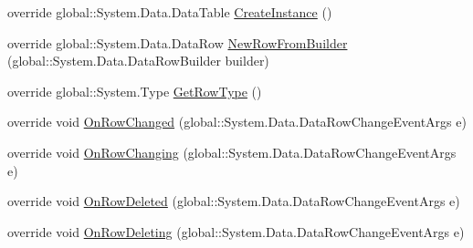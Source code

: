 \begin{DoxyCompactItemize}
\item 
override global\+::\+System.\+Data.\+Data\+Table \hyperlink{class_env_int_1_1_win32_1_1_field_tech_1_1_manager_1_1_data_sets_1_1_guide_ware_mobile_data_set_1_1_calibration_data_table_a2c941f5945959302f3eb4aafe6758c40}{Create\+Instance} ()
\item 
override global\+::\+System.\+Data.\+Data\+Row \hyperlink{class_env_int_1_1_win32_1_1_field_tech_1_1_manager_1_1_data_sets_1_1_guide_ware_mobile_data_set_1_1_calibration_data_table_adcb904b6ae18c9827955d75fa0619298}{New\+Row\+From\+Builder} (global\+::\+System.\+Data.\+Data\+Row\+Builder builder)
\item 
override global\+::\+System.\+Type \hyperlink{class_env_int_1_1_win32_1_1_field_tech_1_1_manager_1_1_data_sets_1_1_guide_ware_mobile_data_set_1_1_calibration_data_table_a02c09718810a0fd3793639bb7c8a7c57}{Get\+Row\+Type} ()
\item 
override void \hyperlink{class_env_int_1_1_win32_1_1_field_tech_1_1_manager_1_1_data_sets_1_1_guide_ware_mobile_data_set_1_1_calibration_data_table_a3186e701b3970cd5966f60b3cd54180f}{On\+Row\+Changed} (global\+::\+System.\+Data.\+Data\+Row\+Change\+Event\+Args e)
\item 
override void \hyperlink{class_env_int_1_1_win32_1_1_field_tech_1_1_manager_1_1_data_sets_1_1_guide_ware_mobile_data_set_1_1_calibration_data_table_af20aa02f6895ae82c8bdff853c0b6d45}{On\+Row\+Changing} (global\+::\+System.\+Data.\+Data\+Row\+Change\+Event\+Args e)
\item 
override void \hyperlink{class_env_int_1_1_win32_1_1_field_tech_1_1_manager_1_1_data_sets_1_1_guide_ware_mobile_data_set_1_1_calibration_data_table_ae3dceb58016dd7b4a361cc0b22d07048}{On\+Row\+Deleted} (global\+::\+System.\+Data.\+Data\+Row\+Change\+Event\+Args e)
\item 
override void \hyperlink{class_env_int_1_1_win32_1_1_field_tech_1_1_manager_1_1_data_sets_1_1_guide_ware_mobile_data_set_1_1_calibration_data_table_a6d00f3f72f3520fbd758eac9a1ec1e8b}{On\+Row\+Deleting} (global\+::\+System.\+Data.\+Data\+Row\+Change\+Event\+Args e)
\end{DoxyCompactItemize}
